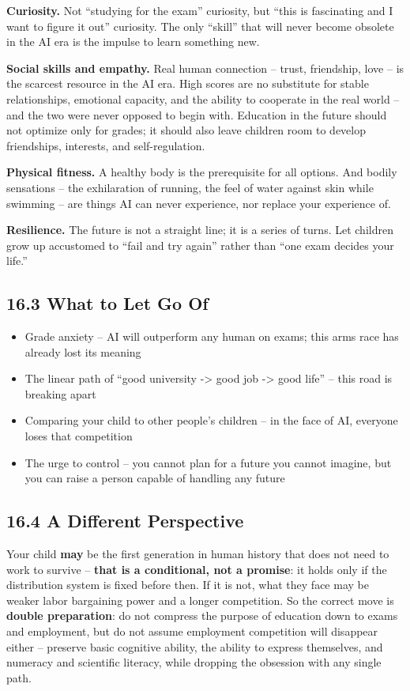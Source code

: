 \documentclass[11pt,a4paper]{article}
\begin{document}
\textbf{Curiosity.} Not ``studying for the exam'' curiosity, but ``this is fascinating and I want to figure it out'' curiosity. The only ``skill'' that will never become obsolete in the AI era is the impulse to learn something new.

\textbf{Social skills and empathy.} Real human connection -- trust, friendship, love -- is the scarcest resource in the AI era. High scores are no substitute for stable relationships, emotional capacity, and the ability to cooperate in the real world -- and the two were never opposed to begin with. Education in the future should not optimize only for grades; it should also leave children room to develop friendships, interests, and self-regulation.

\textbf{Physical fitness.} A healthy body is the prerequisite for all options. And bodily sensations -- the exhilaration of running, the feel of water against skin while swimming -- are things AI can never experience, nor replace your experience of.

\textbf{Resilience.} The future is not a straight line; it is a series of turns. Let children grow up accustomed to ``fail and try again'' rather than ``one exam decides your life.''

\subsection{16.3 What to Let Go Of}

\begin{itemize}
  \item Grade anxiety -- AI will outperform any human on exams; this arms race has already lost its meaning
  \item The linear path of ``good university -> good job -> good life'' -- this road is breaking apart
  \item Comparing your child to other people's children -- in the face of AI, everyone loses that competition
  \item The urge to control -- you cannot plan for a future you cannot imagine, but you can raise a person capable of handling any future
\end{itemize}

\subsection{16.4 A Different Perspective}

Your child \textbf{may} be the first generation in human history that does not need to work to survive -- \textbf{that is a conditional, not a promise}: it holds only if the distribution system is fixed before then. If it is not, what they face may be weaker labor bargaining power and a longer competition. So the correct move is \textbf{double preparation}: do not compress the purpose of education down to exams and employment, but do not assume employment competition will disappear either -- preserve basic cognitive ability, the ability to express themselves, and numeracy and scientific literacy, while dropping the obsession with any single path.
\end{document}
